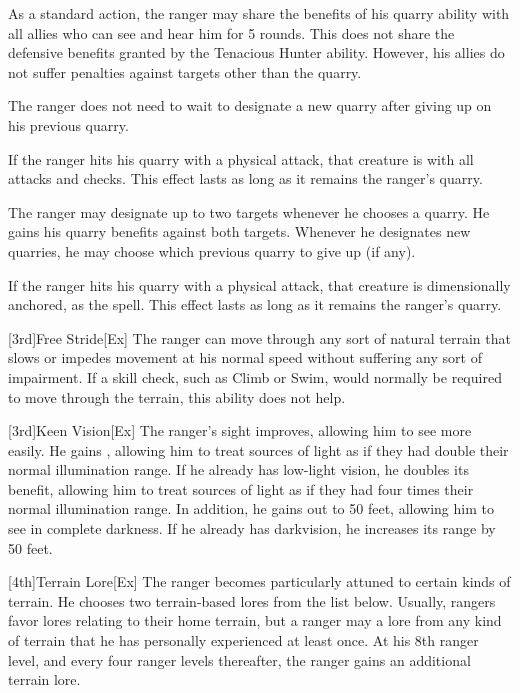     As a standard action, the ranger may share the benefits of his quarry ability with all allies who can see and hear him for 5 rounds.
    This does not share the defensive benefits granted by the Tenacious Hunter ability.
    However, his allies do not suffer penalties against targets other than the quarry.

    The ranger does not need to wait to designate a new quarry after giving up on his previous quarry.

    If the ranger hits his quarry with a physical attack, that creature is \impaired with all attacks and checks.
    This effect lasts as long as it remains the ranger's quarry.

    The ranger may designate up to two targets whenever he chooses a quarry.
    He gains his quarry benefits against both targets.
    Whenever he designates new quarries, he may choose which previous quarry to give up (if any).

    If the ranger hits his quarry with a physical attack, that creature is dimensionally anchored, as the  spell.
    This effect lasts as long as it remains the ranger's quarry.

[3rd]{Free Stride}[Ex]
The ranger can move through any sort of natural terrain that slows or impedes movement at his normal speed without suffering any sort of impairment.
If a skill check, such as Climb or Swim, would normally be required to move through the terrain, this ability does not help.

[3rd]{Keen Vision}[Ex]
The ranger's sight improves, allowing him to see more easily.
He gains , allowing him to treat sources of light as if they had double their normal illumination range.
If he already has low-light vision, he doubles its benefit, allowing him to treat sources of light as if they had four times their normal illumination range.
In addition, he gains  out to 50 feet, allowing him to see in complete darkness.
If he already has darkvision, he increases its range by 50 feet.

[4th]{Terrain Lore}[Ex]
The ranger becomes particularly attuned to certain kinds of terrain.
He chooses two terrain-based lores from the list below.
Usually, rangers favor lores relating to their home terrain, but a ranger may a lore from any kind of terrain that he has personally experienced at least once.
At his 8th ranger level, and every four ranger levels thereafter, the ranger gains an additional terrain lore.

